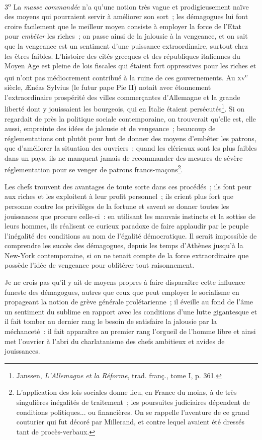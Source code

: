 \documentclass[french,twoside]{book} %
\begin{document}
3\textsuperscript{o} La \emph{masse commandée} n’a qu’une notion très vague et prodigieusement naïve des moyens qui pourraient servir à améliorer son sort ; les démagogues lui font croire facilement que le meilleur moyen consiste à employer la force de l’Etat pour \emph{embêter} les riches ; on  passe ainsi de la jalousie à la vengeance, et on sait que la vengeance est un sentiment d’une puissance extraordinaire, surtout chez les êtres faibles. L’histoire des cités grecques et des républiques italiennes du Moyen Age est pleine de lois fiscales qui étaient fort oppressives pour les riches et qui n’ont pas médiocrement contribué à la ruine de ces gouvernements. Au {\scshape xv}\textsuperscript{e} siècle, Ænéas Sylvius (le futur pape Pie II) notait avec étonnement l’extraordinaire prospérité des villes commerçantes d’Allemagne et la grande liberté dont y jouissaient les bourgeois, qui en Italie étaient persécutés\footnote{ \noindent Janssen, \emph{L’Allemagne et la Réforme}, trad. franç., tome I, p. 361.
 }. Si on regardait de près la politique sociale contemporaine, on trouverait qu’elle est, elle aussi, empreinte des idées de jalousie et de vengeance ; beaucoup de réglementations ont plutôt pour but de donner des moyens d’embêter les patrons, que d’améliorer la situation des ouvriers ; quand les cléricaux sont les plus faibles dans un pays, ils ne manquent jamais de recommander des mesures de sévère réglementation pour se venger de patrons francs-maçons\footnote{ \noindent L’application des lois sociales donne lieu, en France du moins, à de très singulières inégalités de traitement ; les poursuites judiciaires dépendent de conditions politiques... ou financières. On se rappelle l’aventure de ce grand couturier qui fut décoré par Millerand, et contre lequel avaient été dressés tant de procès-verbaux.
 }.\par
Les chefs trouvent des avantages de toute sorte dans ces procédés ; ils font peur aux riches et les exploitent à leur profit personnel ; ils crient plus fort que personne contre les privilèges de la fortune et savent se donner  toutes les jouissances que procure celle-ci : en utilisant les mauvais instincts et la sottise de leurs hommes, ils réalisent ce curieux paradoxe de faire applaudir par le peuple l’inégalité des conditions au nom de l’égalité démocratique. Il serait impossible de comprendre les succès des démagogues, depuis les temps d’Athènes jusqu’à la New-York contemporaine, si on ne tenait compte de la force extraordinaire que possède l’idée de vengeance pour oblitérer tout raisonnement.\par
Je ne crois pas qu’il y ait de moyens propres à faire disparaître cette influence funeste des démagogues, autres que ceux que peut employer le socialisme en propageant la notion de grève générale prolétarienne ; il éveille au fond de l’âme un sentiment du sublime en rapport avec les conditions d’une lutte gigantesque et il fait tomber au dernier rang le besoin de satisfaire la jalousie par la méchanceté : il fait apparaître au premier rang l’orgueil de l’homme libre et ainsi met l’ouvrier à l’abri du charlatanisme des chefs ambitieux et avides de jouissances.\par
\end{document}

